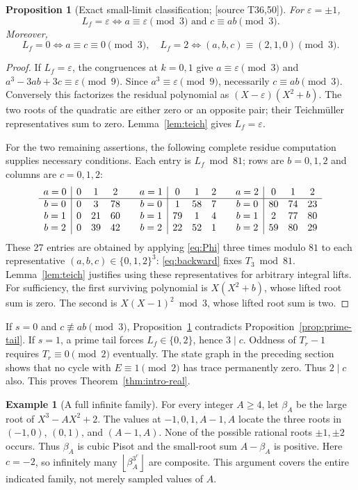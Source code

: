 \documentclass[11pt,a4paper]{article}
\newtheorem{proposition}[theorem]{Proposition}
\theoremstyle{definition}\newtheorem{definition}[theorem]{Definition}
\newtheorem{example}[theorem]{Example}
\theoremstyle{remark}\newtheorem{remark}[theorem]{Remark}
\newcommand{\floor}[1]{\left\lfloor #1\right\rfloor}\newcommand{\ceil}[1]{\left\lceil #1\right\rceil}
\newcommand{\sourceT}[1]{\textup{[source T#1]}}
\begin{document}
\begin{proposition}[Exact small-limit classification; \sourceT{36,50}]\label{prop:classify}
For $\varepsilon=\pm1$,
\[
 L_f=\varepsilon\iff a\equiv\varepsilon\pmod3\text{ and }c\equiv ab\pmod3.
\]
Moreover,
\[
 L_f=0\iff a\equiv c\equiv0\pmod3,
\quad
 L_f=2\iff(a,b,c)\equiv(2,1,0)\pmod3.
\]
\end{proposition}
\begin{proof}
If $L_f=\varepsilon$, the congruences at $k=0,1$ give $a\equiv\varepsilon\pmod3$ and
$a^3-3ab+3c\equiv\varepsilon\pmod9$. Since $a^3\equiv\varepsilon\pmod9$, necessarily $c\equiv ab\pmod3$. Conversely this factorizes the residual polynomial as $(X-\varepsilon)(X^2+b)$. The two roots of the quadratic are either zero or an opposite pair; their Teichm\"uller representatives sum to zero. Lemma~\ref{lem:teich} gives $L_f=\varepsilon$.

For the two remaining assertions, the following complete residue computation supplies necessary conditions. Each entry is $L_f\bmod81$; rows are $b=0,1,2$ and columns are $c=0,1,2$:
\[
\begin{array}{c|ccc@{\qquad}c|ccc@{\qquad}c|ccc}
 a=0&0&1&2&a=1&0&1&2&a=2&0&1&2\\\hline
 b=0&0&3&78&b=0&1&58&7&b=0&80&74&23\\
 b=1&0&21&60&b=1&79&1&4&b=1&2&77&80\\
 b=2&0&39&42&b=2&22&52&1&b=2&59&80&29
\end{array}
\]
These 27 entries are obtained by applying \eqref{eq:Phi} three times modulo $81$ to each representative $(a,b,c)\in\{0,1,2\}^3$: \eqref{eq:backward} fixes $T_3\bmod81$. Lemma~\ref{lem:teich} justifies using these representatives for arbitrary integral lifts. For sufficiency, the first surviving polynomial is $X(X^2+b)$, whose lifted root sum is zero. The second is $X(X-1)^2\bmod3$, whose lifted root sum is two.
\end{proof}
If $s=0$ and $c\not\equiv ab\pmod3$, Proposition~\ref{prop:classify} contradicts Proposition~\ref{prop:prime-tail}. If $s=1$, a prime tail forces $L_f\in\{0,2\}$, hence $3\mid c$. Oddness of $T_r-1$ requires $T_r\equiv0\pmod2$ eventually. The state graph in the preceding section shows that no cycle with $E\equiv1\pmod2$ has trace permanently zero. Thus $2\mid c$ also. This proves Theorem~\ref{thm:intro-real}.

\begin{example}[A full infinite family]
For every integer $A\ge4$, let $\beta_A$ be the large root of $X^3-AX^2+2$. The values at $-1,0,1,A-1,A$ locate the three roots in $(-1,0)$, $(0,1)$, and $(A-1,A)$. None of the possible rational roots $\pm1,\pm2$ occurs. Thus $\beta_A$ is cubic Pisot and the small-root sum $A-\beta_A$ is positive. Here $c=-2$, so infinitely many $\floor{\beta_A^{3^r}}$ are composite. This argument covers the entire indicated family, not merely sampled values of $A$.
\end{example}
\end{document}
